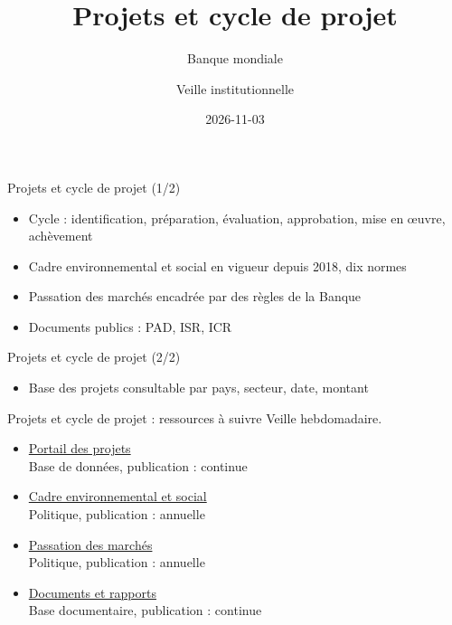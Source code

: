 \documentclass[aspectratio=169,11pt]{beamer}
\title{Projets et cycle de projet}
\subtitle{Banque mondiale}
\author{Veille institutionnelle}
\date{2026-11-03}
\begin{document}
\begin{frame}\titlepage\end{frame}

\begin{frame}{Projets et cycle de projet (1/2)}
\begin{itemize}
\item Cycle : identification, préparation, évaluation, approbation, mise en œuvre, achèvement
\item Cadre environnemental et social en vigueur depuis 2018, dix normes
\item Passation des marchés encadrée par des règles de la Banque
\item Documents publics : PAD, ISR, ICR
\end{itemize}
\end{frame}

\begin{frame}{Projets et cycle de projet (2/2)}
\begin{itemize}
\item Base des projets consultable par pays, secteur, date, montant
\end{itemize}
\end{frame}

\begin{frame}{Projets et cycle de projet : ressources à suivre}
\small
Veille hebdomadaire.
\begin{itemize}
\item \href{https://projects.worldbank.org}{Portail des projets}\\{\footnotesize Base de données, publication : continue}
\item \href{https://www.worldbank.org/en/projects-operations/environmental-and-social-framework}{Cadre environnemental et social}\\{\footnotesize Politique, publication : annuelle}
\item \href{https://www.worldbank.org/en/projects-operations/procurement}{Passation des marchés}\\{\footnotesize Politique, publication : annuelle}
\item \href{https://documents.worldbank.org}{Documents et rapports}\\{\footnotesize Base documentaire, publication : continue}
\end{itemize}
\end{frame}
\end{document}
